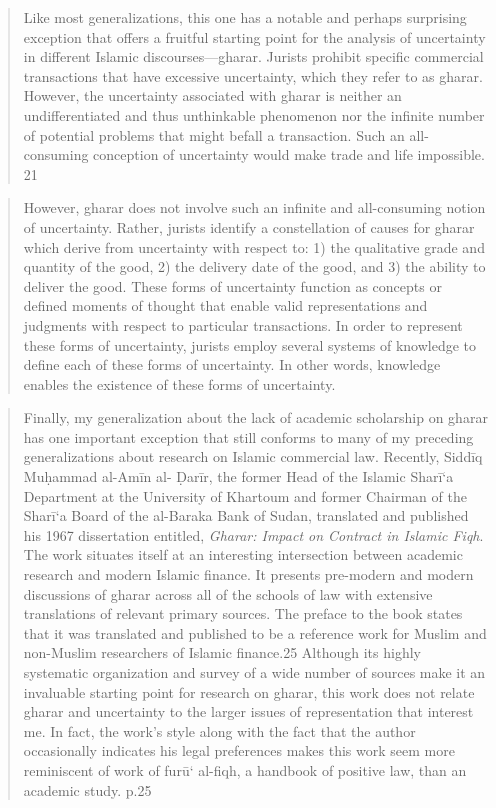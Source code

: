 \begin{quote}
    Like most generalizations, this one has a notable and perhaps surprising exception
that offers a fruitful starting point for the analysis of uncertainty in different Islamic
discourses—gharar. Jurists prohibit specific commercial transactions that have excessive
uncertainty, which they refer to as gharar. However, the uncertainty associated with
gharar is neither an undifferentiated and thus unthinkable phenomenon nor the infinite
number of potential problems that might befall a transaction. Such an all-consuming
conception of uncertainty would make trade and life impossible. 21
\end{quote}
\begin{quote}
    However, gharar does not involve such an infinite and all-consuming notion of
uncertainty. Rather, jurists identify a constellation of causes for gharar which derive
from uncertainty with respect to: 1) the qualitative grade and quantity of the good, 2) the
delivery date of the good, and 3) the ability to deliver the good. These forms of
uncertainty function as concepts or defined moments of thought that enable valid
representations and judgments with respect to particular transactions. In order to
represent these forms of uncertainty, jurists employ several systems of knowledge to
define each of these forms of uncertainty. In other words, knowledge enables the
existence of these forms of uncertainty.
\cite{Rittenberg:Gharar}
\end{quote}

\begin{quote}
    Finally, my generalization about the lack of academic scholarship on gharar has
one important exception that still conforms to many of my preceding generalizations
about research on Islamic commercial law. Recently, Siddīq Muḥammad al-Amīn al-
Ḍarīr, the former Head of the Islamic Sharī‘a Department at the University of Khartoum
and former Chairman of the Sharī‘a Board of the al-Baraka Bank of Sudan, translated and
published his 1967 dissertation entitled, \textit{Gharar: Impact on Contract in Islamic Fiqh}.
The work situates itself at an interesting intersection between academic research and
modern Islamic finance. It presents pre-modern and modern discussions of gharar across
all of the schools of law with extensive translations of relevant primary sources. The
preface to the book states that it was translated and published to be a reference work for
Muslim and non-Muslim researchers of Islamic finance.25 Although its highly systematic
organization and survey of a wide number of sources make it an invaluable starting point
for research on gharar, this work does not relate gharar and uncertainty to the larger
issues of representation that interest me. In fact, the work’s style along with the fact that
the author occasionally indicates his legal preferences makes this work seem more
reminiscent of work of furū‘ al-fiqh, a handbook of positive law, than an academic study. p.25
\end{quote}


